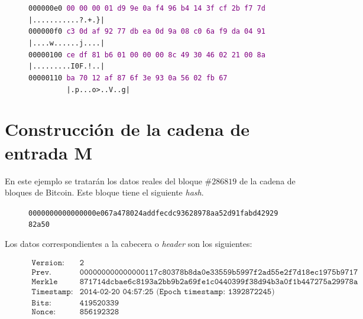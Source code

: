 \documentclass{article}
\begin{document}
\begin{figure}[H]
{{    \texttt{000000e0  \textcolor{purple}{00 00 00 01 d9 9e 0a f4  96 b4 14 3f cf 2b f7 7d}  |...........?.+.\}|} \\
    \texttt{000000f0  \textcolor{purple}{c3 0d af 92 77 db ea 0d  9a 08 c0 6a f9 da 04 91}  |....w......j....|} \\
    \texttt{00000100  \textcolor{purple}{ce df 81 b6 01 00 00 00  8c 49 30 46 02 21 00 8a}  |.........I0F.!..|} \\
    \texttt{00000110  \textcolor{purple}{ba 70 12 af 87 6f 3e 93  0a 56 02 fb 67} \ \ \ \ \ \ \ \ \ |.p...o>..V..g|}} \\
    }
    \end{figure}

\section{Construcción de la cadena de entrada M}
    En este ejemplo se tratarán los datos reales del bloque $\#286819$ de la cadena de bloques de Bitcoin. Este bloque tiene el siguiente \textit{hash}.
    
    \begin{figure}[H]
        \centering
        \scriptsize{
        \texttt{0000000000000000e067a478024addfecdc93628978aa52d91fabd4292982a50}
        }
    \end{figure}
    
    Los datos correspondientes a la cabecera o \textit{header} son los siguientes:
    \begin{figure}[H]
        \centering
        \scriptsize{
            $\begin{array}{ll}
                \texttt{Version:} & \texttt{2} \\
                \texttt{Prev. Block:} & \texttt{000000000000000117c80378b8da0e33559b5997f2ad55e2f7d18ec1975b9717} \\
                \texttt{Merkle root:} & \texttt{871714dcbae6c8193a2bb9b2a69fe1c0440399f38d94b3a0f1b447275a29978a} \\
                \texttt{Timestamp:} & \texttt{2014-02-20 04:57:25 (Epoch timestamp: 1392872245)} \\
                \texttt{Bits:} & \texttt{419520339} \\
                \texttt{Nonce:} & \texttt{856192328} \\
            \end{array}$
        }
        \end{figure}
    
\end{document}
